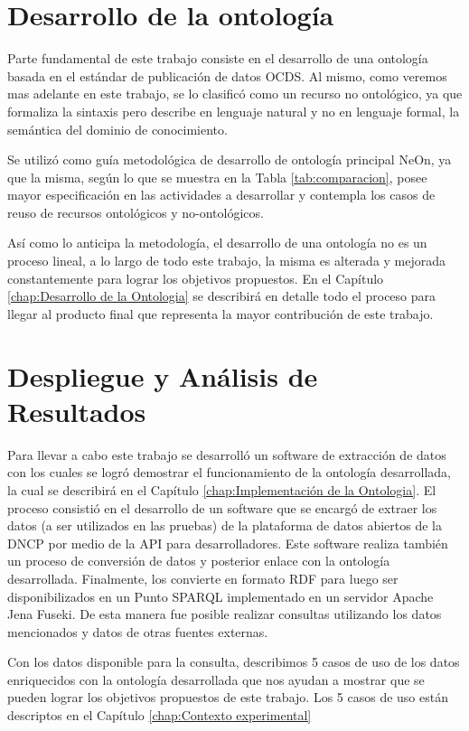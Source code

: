 \section{Desarrollo de la ontología}
\label{section:desarrolloOntologia}

Parte fundamental de este trabajo consiste en el desarrollo de una ontología basada en el estándar de publicación de datos OCDS. Al mismo,  como veremos mas adelante en este trabajo, se lo clasificó como un recurso no ontológico, ya que formaliza la sintaxis pero describe en lenguaje natural y no en lenguaje formal, la semántica del dominio de conocimiento. 

Se utilizó como guía metodológica de desarrollo de ontología principal NeOn, ya que la misma, según lo que se muestra en la Tabla  \ref{tab:comparacion}, posee mayor especificación en las actividades a desarrollar  y contempla los casos de reuso de recursos ontológicos y no-ontológicos. 

Así como lo anticipa la metodología, el desarrollo de una ontología no es un proceso lineal, a lo largo de todo este trabajo, la misma es alterada y mejorada constantemente para lograr los objetivos propuestos. En el Capítulo \ref{chap:Desarrollo de la Ontologia} se describirá en detalle todo el proceso para llegar al producto final que representa la mayor contribución de este trabajo.

\section{Despliegue y Análisis de Resultados}
\label{section:despliegue}

Para llevar a cabo este trabajo se desarrolló un software de extracción de datos con los cuales se logró demostrar el funcionamiento de la ontología desarrollada, la cual se describirá en el Capítulo \ref{chap:Implementación de la Ontologia}. El proceso consistió en el desarrollo de un software que se encargó de extraer los datos (a ser utilizados en las pruebas) de la plataforma de datos abiertos de la DNCP por medio de la API para desarrolladores. Este software realiza también un proceso de conversión de datos y posterior enlace con la ontología desarrollada. Finalmente, los convierte en formato RDF para luego ser disponibilizados en un Punto SPARQL implementado en un servidor Apache Jena Fuseki. De esta manera fue posible realizar consultas utilizando los datos mencionados y datos de otras fuentes externas.

Con los datos disponible para la consulta, describimos 5 casos de uso de los datos enriquecidos con la ontología desarrollada que nos ayudan a mostrar que se pueden lograr los objetivos propuestos de este trabajo. Los 5 casos de uso están descriptos en el Capítulo \ref{chap:Contexto experimental}


